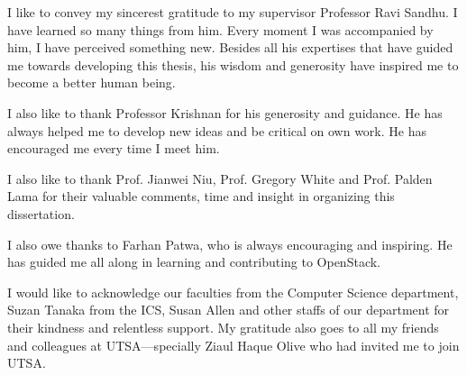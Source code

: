 \begin{acknowledgements}
I like to convey my sincerest gratitude to my supervisor Professor Ravi Sandhu. I have  learned so many things from him. Every moment I was accompanied by him, I have perceived something new. Besides all his expertises that have guided me towards developing this thesis, his wisdom and generosity have inspired me to become a better human being. 


I also like to thank Professor Krishnan for his generosity and guidance. He has always helped me to develop  new ideas and be critical on own work. He has encouraged me every time I meet him.

I also like to thank Prof. Jianwei Niu, Prof. Gregory White and Prof. Palden Lama for their valuable comments, time and insight in organizing this dissertation.

I also owe thanks to Farhan Patwa, who is always encouraging and inspiring. He has guided me all along in learning and contributing to OpenStack. 

 I would like to acknowledge our faculties from the Computer Science department, Suzan Tanaka from the ICS, Susan Allen and other staffs of our department for their kindness and relentless support. My gratitude also goes to all my friends and colleagues at UTSA---specially Ziaul Haque Olive who had invited me to join UTSA.
 


\end{acknowledgements}